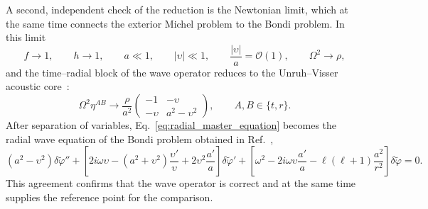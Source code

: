 \documentclass[12pt,a4paper,preprint,nopreprintline]{elsarticle}
\begin{document}
A second, independent check of the reduction is the Newtonian limit, which at the same time connects the exterior Michel problem to the Bondi problem. In this limit
\begin{equation}
    f\rightarrow1,\qquad
    h\rightarrow1,\qquad
    a\ll1,\qquad
    |\upsilon|\ll1,
    \qquad
    \frac{|\upsilon|}{a}=\mathcal{O}(1),
    \qquad
    \Omega^{2}\rightarrow\rho,
    \label{eq:newtonian_limit}
\end{equation}
and the time--radial block of the wave operator reduces to the Unruh--Visser acoustic core~\cite{UnruhWG_ExperimentalBlackHoleEvaporation_1981,VisserM_AcousticBlackHolesHorizonsErgospheresAndHawkingRadiation_1998}:
\begin{equation}
    \Omega^{2}\eta^{AB}
    \longrightarrow
    \frac{\rho}{a^{2}}
    \begin{pmatrix}
        -1 & -\upsilon\\
        -\upsilon & a^{2}-\upsilon^{2}
    \end{pmatrix},
    \qquad A,B\in\{t,r\}.
    \label{eq:newtonian_acoustic_core}
\end{equation}
After separation of variables, Eq.~\eqref{eq:radial_master_equation} becomes the radial wave equation of the Bondi problem obtained in Ref.~\cite{KovalenkoIG_EreminMA_SpatialInstabilityOfSphericalAccretion_1998},
\begin{equation}
    (a^{2}-\upsilon^{2})\delta\widetilde{\varphi}''
    +
    \left[
        2i\omega\upsilon
        -(a^{2}+\upsilon^{2})\frac{\upsilon'}{\upsilon}
        +2\upsilon^{2}\frac{a'}{a}
    \right]\delta\widetilde{\varphi}'
    +
    \left[
        \omega^{2}
        -2i\omega\upsilon\frac{a'}{a}
        -\ell(\ell+1)\frac{a^{2}}{r^{2}}
    \right]\delta\widetilde{\varphi}=0.
    \label{eq:kovalenko_eremin_limit}
\end{equation}
This agreement confirms that the wave operator is correct and at the same time supplies the reference point for the comparison.
\end{document}
